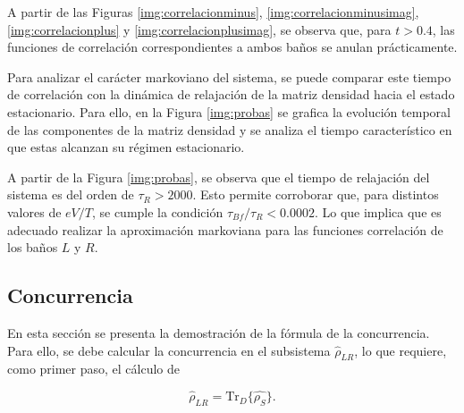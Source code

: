 \begin{appendixs}



A partir de las Figuras \ref{img:correlacionminus}, \ref{img:correlacionminusimag}, \ref{img:correlacionplus} y \ref{img:correlacionplusimag}, se observa que, para $t > 0.4$, las funciones de correlación correspondientes a ambos baños se anulan prácticamente. 

Para analizar el carácter markoviano del sistema, se puede comparar este tiempo de correlación con la dinámica de relajación de la matriz densidad hacia el estado estacionario. Para ello, en la Figura \ref{img:probas} se grafica la evolución temporal de las componentes de la matriz densidad y se analiza el tiempo característico en que estas alcanzan su régimen estacionario.



A partir de la Figura \ref{img:probas}, se observa que el tiempo de relajación del sistema es del orden de $\tau_{R} > 2000$. Esto permite corroborar que, para distintos valores de $eV/T$, se cumple la condición $\tau_{Bf}/\tau_{R} < 0.0002$. Lo que implica que es adecuado realizar la aproximación markoviana para las funciones correlación de los baños $L$ y $R$.

\label{appendix5tauf}

\newpage 

\subsection{Concurrencia}
En esta sección se presenta la demostración de la fórmula de la concurrencia. Para ello, se debe calcular la concurrencia en el subsistema $\hat{\rho}_{LR}$, lo que requiere, como primer paso, el cálculo de

\begin{equation*}
    \hat{\rho}_{LR} = \text{Tr}_{D}\{ \hat{\rho_{S}} \}.
\end{equation*}


\end{appendixs}
